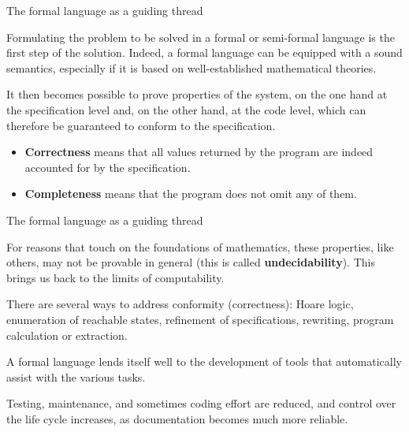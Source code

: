 \documentclass[compress,dvips,xcolor={dvipsnames},t]{beamer}
\begin{document}
%
\begin{frame}{The formal language as a guiding thread}

  Formulating the problem to be solved in a formal or semi-formal
  language is the first step of the solution. Indeed, a formal
  language can be equipped with a sound semantics, especially if it is
  based on well\hyp{}established mathematical theories.

  \bigskip

  It then becomes possible to prove properties of the system,
  on the one hand at the specification level and, on the other hand,
  at the code level, which can therefore be guaranteed to conform to
  the specification.

  \medskip

  \begin{itemize}

    \item \textbf{Correctness} means that all values returned by the
      program are indeed accounted for by the specification.

      \item \textbf{Completeness} means that the program does not omit
        any of them.

  \end{itemize}

\end{frame}

%
\begin{frame}{The formal language as a guiding thread}

  For reasons that touch on the foundations of mathematics, these
  properties, like others, may not be provable in general (this is
  called \textbf{undecidability}). This brings us back to the limits
  of computability.

  \bigskip

  There are several ways to address conformity (correctness): Hoare
  logic, enumeration of reachable states, refinement of
  specifications, rewriting, program calculation or extraction.

  \bigskip

  A formal language lends itself well to the development of tools that
  automatically assist with the various tasks.

  \bigskip

  Testing, maintenance, and sometimes coding effort are
  reduced, and control over the life cycle increases, as
  documentation becomes much more reliable.

\end{frame}
\end{document}

